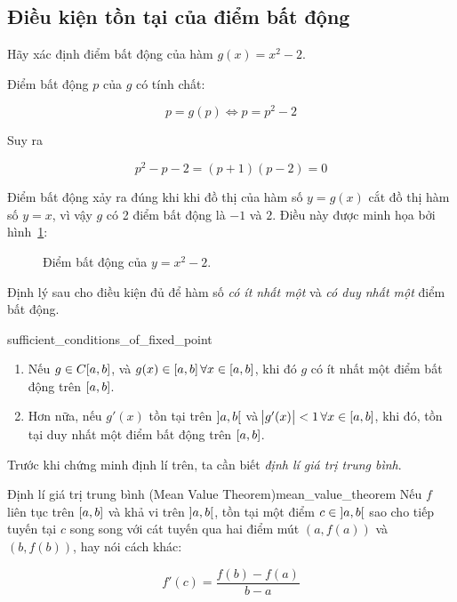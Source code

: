 \documentclass[../../Lectures]{subfiles}
\begin{document}
\subsection{Điều kiện tồn tại của điểm bất động}

\begin{exmp}
    Hãy xác định điểm bất động của hàm \(g(x) = x^2 - 2\).

    Điểm bất động \(p\) của \(g\) có tính chất:

    \[p= g(p) \iff p = p^2 - 2\]

    Suy ra

    \[p^2 - p - 2 = (p + 1)(p - 2) = 0\]

    Điểm bất động xảy ra đúng khi khi đồ thị của hàm số \(y = g(x)\) cắt đồ thị
    hàm số \(y = x\), vì vậy \(g\) có 2 điểm bất động là \(-1\) và \(2\). Điều
    này được minh họa bởi hình~\ref{fig:exmp_2.2_fixed_point}:

    \begin{figure}[H]
        \centering
        
        \caption{Điểm bất động của \(y = x^2 - 2\).}
        \label{fig:exmp_2.2_fixed_point}    %
    \end{figure}
\end{exmp}

Định lý sau cho điều kiện đủ để hàm số \emph{có ít nhất một} và \emph{có duy
nhất một} điểm bất động.

\begin{ctheorem}{}{sufficient_conditions_of_fixed_point}
\begin{enumerate}
    \item Nếu \(g \in C \interval{a}{b}\), và \(g(x) \in \interval{a}{b} \,
        \forall x \in \interval{a}{b}\), khi đó \(g\) có ít nhất một điểm bất
        động trên \(\interval{a}{b}\).

    \item Hơn nữa, nếu \(g'(x)\) tồn tại trên \(\interval[open]{a}{b}\) và
        \(\abs{g'(x)} < 1 \, \forall x \in \interval{a}{b}\), khi đó, tồn tại
        duy nhất một điểm bất động trên \(\interval{a}{b}\).
\end{enumerate}
\end{ctheorem}

Trước khi chứng minh định lí trên, ta cần biết \emph{định lí giá trị trung
bình}.

\begin{ctheorem}{Định lí giá trị trung bình (Mean Value Theorem)}{mean_value_theorem}
    Nếu \(f\) liên tục trên \(\interval{a}{b}\) và khả vi trên
    \(\interval[open]{a}{b}\), tồn tại một điểm \(c \in \interval[open]{a}{b}\)
    sao cho tiếp tuyến tại \(c\) song song với cát tuyến qua hai điểm mút \((a,
    f(a))\) và \((b, f(b))\), hay nói cách khác:

    \[f'(c) = \frac{f(b) - f(a)}{b - a}\]
\end{ctheorem}
\end{document}
